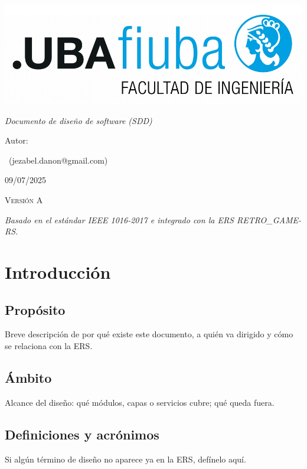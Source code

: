 \documentclass[11pt,a4paper]{article}
\newcommand{\versionActual}{A}
\newcommand{\fechaA}{09/07/2025}
\newcommand{\fechaActual}{\fechaA}
\begin{document}
\begin{titlepage}
  \centering
  \includegraphics[width=.7\textwidth]{Figuras/logoFIUBA.pdf}\par
  \vspace{1cm}
  {\Huge\textbf{\ttitle}}\par
  \vspace{1.5cm}
  {\Large\itshape Documento de diseño de software (SDD)\par}
  \vspace{3cm}
  \flushleft
  {\normalsize Autor:}\par
  {\Large \authorname\ (jezabel.danon@gmail.com)}\par
  \vspace{1.5cm}
  {\scshape\LARGE \fechaActual}\par
  {\scshape\LARGE Versión \versionActual}\par
  \vfill
  \centering
  \textit{Basado en el estándar IEEE 1016-2017 e integrado con la ERS RETRO\_GAME-RS.}
\end{titlepage}

\clearpage
\tableofcontents
\clearpage

\section{Introducción}
\subsection{Propósito}
Breve descripción de por qué existe este documento, a quién va dirigido y cómo se relaciona con la ERS.

\subsection{Ámbito}
Alcance del diseño: qué módulos, capas o servicios cubre; qué queda fuera.

\subsection{Definiciones y acrónimos}
Si algún término de diseño no aparece ya en la ERS, defínelo aquí.
\end{document}
